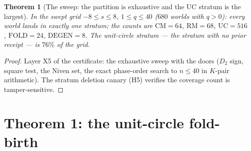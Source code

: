 \documentclass[11pt]{article}
\newtheorem{theorem}{Theorem}[section]
\begin{document}
\begin{theorem}[The sweep: the partition is exhaustive and the UC
stratum is the largest]\label{thm:sweep}
In the swept grid $-8\le s\le 8$, $1\le q\le 40$ ($680$ worlds with
$q>0$): every world lands in exactly one stratum; the counts are
$\mathrm{CM}=64$, $\mathrm{RM}=68$, $\mathrm{UC}=516$,
$\mathrm{FOLD}=24$, $\mathrm{DEGEN}=8$. The unit-circle stratum ---
the stratum with no prior receipt --- is $76\%$ of the grid.
\end{theorem}

\begin{proof}
Layer X5 of the certificate: the exhaustive sweep with the doors
($D_2$ sign, square test, the Niven set, the exact phase-order search
to $n\le40$ in $K$-pair arithmetic). The stratum deletion canary (H5)
verifies the coverage count is tamper-sensitive.
\end{proof}

\section{Theorem 1: the unit-circle fold-birth}
\end{document}
